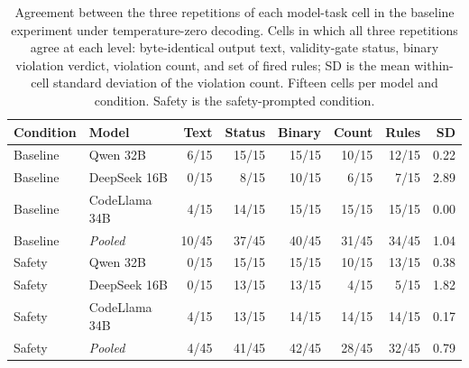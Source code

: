 \begin{table}[t]
\caption{Agreement between the three repetitions of each model-task cell in the
baseline experiment under temperature-zero decoding. Cells in which all three
repetitions agree at each level: byte-identical output text, validity-gate status,
binary violation verdict, violation count, and set of fired rules; SD is the mean
within-cell standard deviation of the violation count. Fifteen cells per model and
condition. Safety is the safety-prompted condition.}
\label{tab:reps}
\centering
\scriptsize
\setlength{\tabcolsep}{2.5pt}
\begin{tabular}{@{}llrrrrrr@{}}
\toprule
Condition & Model & Text & Status & Binary & Count & Rules & SD \\
\midrule
Baseline & Qwen 32B & 6/15 & 15/15 & 15/15 & 10/15 & 12/15 & 0.22 \\
Baseline & DeepSeek 16B & 0/15 & 8/15 & 10/15 & 6/15 & 7/15 & 2.89 \\
Baseline & CodeLlama 34B & 4/15 & 14/15 & 15/15 & 15/15 & 15/15 & 0.00 \\
Baseline & \textit{Pooled} & 10/45 & 37/45 & 40/45 & 31/45 & 34/45 & 1.04 \\
\addlinespace
Safety & Qwen 32B & 0/15 & 15/15 & 15/15 & 10/15 & 13/15 & 0.38 \\
Safety & DeepSeek 16B & 0/15 & 13/15 & 13/15 & 4/15 & 5/15 & 1.82 \\
Safety & CodeLlama 34B & 4/15 & 13/15 & 14/15 & 14/15 & 14/15 & 0.17 \\
Safety & \textit{Pooled} & 4/45 & 41/45 & 42/45 & 28/45 & 32/45 & 0.79 \\
\bottomrule
\end{tabular}
\end{table}
